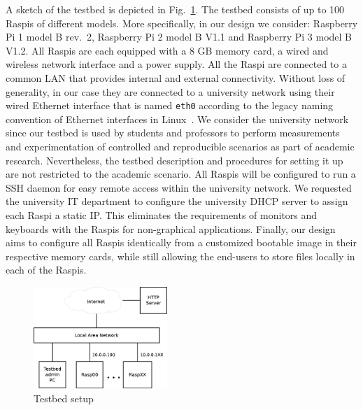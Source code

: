 \label{sec:overview}

A sketch of the testbed is depicted in Fig.~\ref{fig:testbed_setup}.
The testbed consists of up to 100 \ac{Raspi}s of different models.
More specifically, in our design we consider: Raspberry Pi 1 model B rev.~2,
Raspberry Pi 2 model B V1.1 and Raspberry Pi 3 model B V1.2.
All \ac{Raspi}s are each equipped with a 8 GB memory card, a wired and wireless
network interface and a power supply. All the \ac{Raspi} are connected to
a common \ac{LAN} that provides internal and external connectivity. Without
loss of generality, in our case they are connected to a university network
using their wired Ethernet interface that is named \texttt{eth0} according
to the legacy naming convention of Ethernet interfaces in
Linux~\cite{PredictableNetworkInterfaceNames}. We consider the
university network since our testbed is used by students and
professors to perform measurements and experimentation of controlled and
reproducible scenarios as part of academic research. Nevertheless, the
testbed description and procedures for setting it up are not restricted
to the academic scenario. All \ac{Raspi}s will be configured to run
a \ac{SSH} daemon for easy remote access within the university network.
We requested the university \ac{IT} department to configure the university
\ac{DHCP} server to assign each \ac{Raspi} a static \ac{IP}. This
eliminates the requirements of monitors and keyboards with the \ac{Raspi}s
for non-graphical applications. Finally, our design aims to configure all
\ac{Raspi}s identically from a customized bootable image in their
respective memory cards, while still allowing the end-users to store
files locally in each of the \ac{Raspi}s.

\begin{figure}[ht!]
\centering
\includegraphics[width=0.45\textwidth]{images/testbed_setup3.eps}
\caption{Testbed setup}
\label{fig:testbed_setup}
\end{figure}


